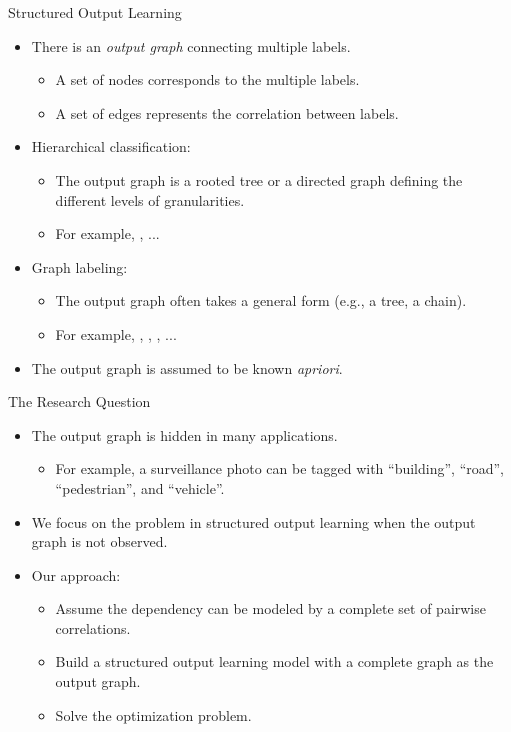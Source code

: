 \documentclass[first=dgreen,second=purple,logo=yellowexc]{aaltoslides}
\begin{document}
\begin{frame}{Structured Output Learning}
	\begin{itemize}
		\item There is an \textit{output graph} connecting multiple labels.
		\begin{itemize}
			\item A set of nodes corresponds to the multiple labels.
			\item A set of edges represents the correlation between labels.
		\end{itemize}
		\item Hierarchical classification:
		\begin{itemize}
			\item The output graph is a rooted tree or a directed graph defining the different levels of granularities.
			\item For example, \svmstruct, ...
		\end{itemize}
		\item Graph labeling:
		\begin{itemize}
			\item The output graph often takes a general form (e.g., a tree, a chain).
			\item For example, \mmmn, \crf, \mmcrf, ...
		\end{itemize}
		\item The output graph is assumed to be known \textit{apriori}.
	\end{itemize}
\end{frame}



%
\begin{frame}{The Research Question}
	\begin{itemize}
		\item The output graph is hidden in many applications.
		\begin{itemize}
			\item For example, a surveillance photo can be tagged with ``building'', ``road'', ``pedestrian'', and ``vehicle''.
		\end{itemize}
		\item We focus on the problem in structured output learning when the output graph is not observed.
		\item Our approach:
		\begin{itemize}
			\item Assume the dependency can be modeled by a complete set of pairwise correlations.
			\item Build a structured output learning model with a complete graph as the output graph.
			\item Solve the optimization problem.
		\end{itemize}
	\end{itemize}
\end{frame}
\end{document}
